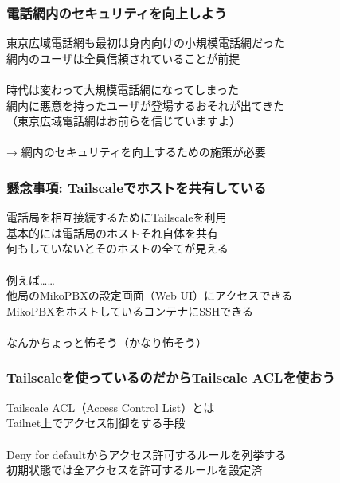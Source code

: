 \documentclass[
  lualatex,
  aspectratio=169,
  14pt
]{beamer}
\begin{document}
\begin{frame}
  \frametitle{電話網内のセキュリティを向上しよう}

  東京広域電話網も最初は身内向けの小規模電話網だった\\
  \hspace{1.5\zw}網内のユーザは全員信頼されていることが前提
  \\~\\[-.5\baselineskip]

  時代は変わって大規模電話網になってしまった\\
  \hspace{1.5\zw}網内に悪意を持ったユーザが登場するおそれが出てきた\\
  \hspace{1.5\zw}（東京広域電話網はお前らを信じていますよ）
  \\~\\[-.5\baselineskip]

  → 網内のセキュリティを向上するための施策が必要

  \note{ }
\end{frame}

\begin{frame}
  \frametitle{懸念事項: Tailscaleでホストを共有している}

  電話局を相互接続するためにTailscaleを利用\\
  \hspace{1.5\zw}基本的には電話局のホストそれ自体を共有\\
  \hspace{1.5\zw}何もしていないとそのホストの全てが見える
  \\~\\[-.5\baselineskip]

  例えば……\\
  \hspace{1.5\zw}他局のMikoPBXの設定画面（Web UI）にアクセスできる\\
  \hspace{1.5\zw}MikoPBXをホストしているコンテナにSSHできる
  \\~\\[-.5\baselineskip]

  なんかちょっと怖そう（かなり怖そう）

  \note{ }
\end{frame}

\begin{frame}
  \frametitle{Tailscaleを使っているのだからTailscale ACLを使おう}

  Tailscale ACL（Access Control List）とは\\
  \hspace{1.5\zw}Tailnet上でアクセス制御をする手段
  \\~\\[-.5\baselineskip]

  Deny for defaultからアクセス許可するルールを列挙する\\
  \hspace{1.5\zw}初期状態では全アクセスを許可するルールを設定済

  \note{ }
\end{frame}
\end{document}
